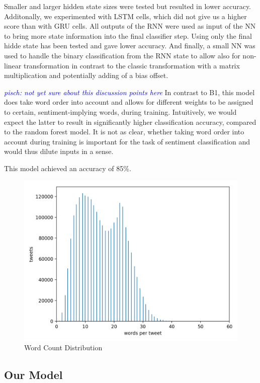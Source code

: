 \documentclass[10pt,conference,compsocconf]{IEEEtran}
\newcommand{\pisch}[1]{\textit{\textcolor{blue}{pisch: #1}}}
\begin{document}
Smaller and larger hidden state sizes were tested but resulted in
lower accuracy. Additonally, we experimented with LSTM cells, which did not give us
a higher score than with GRU cells.
All outputs of the RNN were used as input of the NN to bring more state
information into the final classifier step. Using only the final hidde
state has been tested and gave lower accuracy.
And finally, a small NN was used to handle the binary classification from the RNN 
state to allow also for non-linear transformation in contrast to the classic 
transformation with a matrix multiplication and potentially adding of a
bias offset.

\pisch{not yet sure about this discussion points here}
In contrast to B1, this model does take word order into account
and allows for different weights to be assigned to certain,
sentiment-implying words, during training. Intuitively, we would
expect the latter to result in significantly higher classification
accuracy, compared to the random forest model. It is not as clear,
whether taking word order into account during training is important
for the task of sentiment classification and would thus dilute inputs
in a sense.

This model achieved an accuracy of 85\%.

\begin{figure}[h!]
  \centering
  \includegraphics[scale=0.53]{word_count_histogram.png}
  \caption{Word Count Distribution}
  \label{fig:wordcount}
\end{figure}


\subsection{Our Model}
\end{document}
